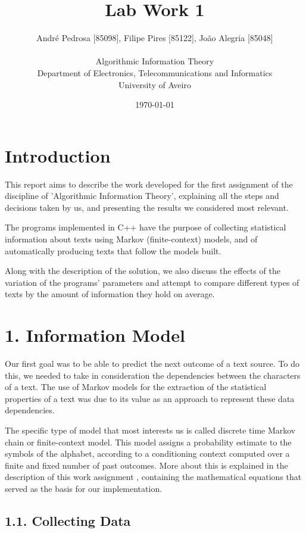 \documentclass[12pt]{article}
\title{Lab Work 1}
\author
{André Pedrosa [85098], Filipe Pires [85122], João Alegria [85048]\\
\\
Algorithmic Information Theory\\
\normalsize{Department of Electronics, Telecommunications and Informatics}\\
\normalsize{University of Aveiro}\\
}
\date{\today{}}
\begin{document}
 

\baselineskip18pt

\maketitle 

\section*{Introduction}

This report aims to describe the work developed for the first assignment
of the discipline of 'Algorithmic Information Theory', explaining all the 
steps and decisions taken by us, and presenting the results we considered 
most relevant.

The programs implemented in C++ have the purpose of collecting statistical
information about texts using Markov (finite-context) models, and of 
automatically producing texts that follow the models built.

Along with the description of the solution, we also discuss the effects
of the variation of the programs' parameters and attempt to compare 
different types of texts by the amount of information they hold on average.
\newpage

\section*{1. Information Model}

Our first goal was to be able to predict the next outcome of a text source.
To do this, we needed to take in consideration the dependencies between 
the characters of a text.
The use of Markov models for the extraction of the statistical properties of a
text was due to its value as an approach to represent these data dependencies.

The specific type of model that most interests us is called discrete time
Markov chain or finite-context model.
This model assigns a probability estimate to the symbols of the alphabet, 
according to a conditioning context computed over a finite and fixed number
of past outcomes. 
More about this is explained in the description of this work assignment 
\cite{trab1}, containing the mathematical equations that served as the basis 
for our implementation.

\subsection*{1.1. Collecting Data}
\end{document}

